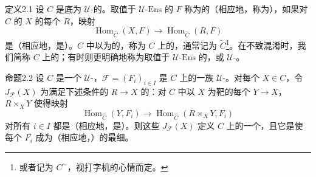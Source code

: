 \begin{SGAresult}{定义}{2.1}
设 $C$ 是底为 $\mathcal U$-的。取值于 $\mathcal U\text{-}\mathrm{Ens}$ 的 $F$ 称为的（相应地，称为），如果对 $C$ 的 $X$ 的每个 $R$，映射
\[\operatorname{Hom}_{\widehat C}(X,F)\longrightarrow\operatorname{Hom}_{\widehat C}(R,F)\]
是（相应地，是）。$\widehat C$ 中以为的，称为 $C$ 上的，通常记为 $\widetilde C$\footnote{或者记为 $C^{\sim}$，视打字机的心情而定。}。在不致混淆时，我们简称 $C$ 上的；有时则更明确地称为取值于 $\mathcal U\text{-}\mathrm{Ens}$ 的，或 $\mathcal U$-。
\end{SGAresult}
\begin{SGAresult}{命题}{2.2}
设 $C$ 是一个 $\mathcal U$-，$\mathscr F=(F_i)_{i\in I}$ 是 $C$ 上的一族 $\mathcal U$-。对每个 $X\in C$，令 $J_{\mathscr F}(X)$ 为满足下述条件的 $R\to X$ 的：对 $C$ 中以 $X$ 为靶的每个 $Y\to X$， $R\times_XY$ 使得映射
\[\operatorname{Hom}_{\widehat C}(Y,F_i)\longrightarrow\operatorname{Hom}_{\widehat C}(R\times_XY,F_i)\]
对所有 $i\in I$ 都是（相应地，是）。则这些 $J_{\mathscr F}(X)$ 定义 $C$ 上的一个，且它是使每个 $F_i$ 成为（相应地，）的最细。
\end{SGAresult}
